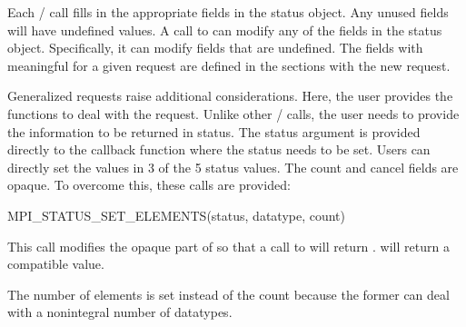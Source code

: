 Each \MPI/
call fills in the appropriate fields in the status object.  
Any unused fields will
have undefined values.  A call to
%
%
%
%
%
%
 can modify any of
the fields in the status object.  Specifically, it can modify fields
that are undefined.  The fields with meaningful  for a given
request are defined in the sections with the new request.

Generalized requests raise additional considerations.  Here, the user
provides the functions to deal with the request.  Unlike other \mpi/
calls, the user needs to provide the information to be returned in
status.  The status argument is provided directly to the callback
function where the status needs to be set.  Users can directly set the
values in 3 of the 5 status values.  The count and cancel fields are
opaque.  To overcome this, 
these calls 
are provided:

\begin{funcdef}{MPI\_STATUS\_SET\_ELEMENTS(status, datatype, count)}
\end{funcdef}

%



This call modifies the opaque part of  so that a call
to  will return .
 will return a compatible value.

\begin{rationale}
The number of elements is set instead of the count because the former
can deal with 
a 
nonintegral number of datatypes.
\end{rationale}


